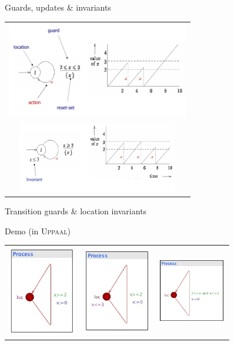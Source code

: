\documentclass{beamer}
\def\uppaal{\textsc{Uppaal}}
\begin{document}
\begin{slide}{Guards, updates \&  invariants}
\small


\begin{tabular}{c}
   \includegraphics[width=8cm]{./images/model0.jpg} \\  \includegraphics[width=7cm]{./images/model1.jpg}
\end{tabular}

\end{slide}

\begin{slide}{Transition guards \& location invariants}
\small

\begin{block}{Demo (in  \uppaal)}
~\\


\begin{tabular}{ccc}
  \includegraphics[width=3cm]{./images/g1.jpg} & \includegraphics[width=3cm]{./images/g2.jpg} &  \includegraphics[width=3cm]{./images/g3.jpg}
\end{tabular}

\end{block}
\end{slide}
\end{document}
